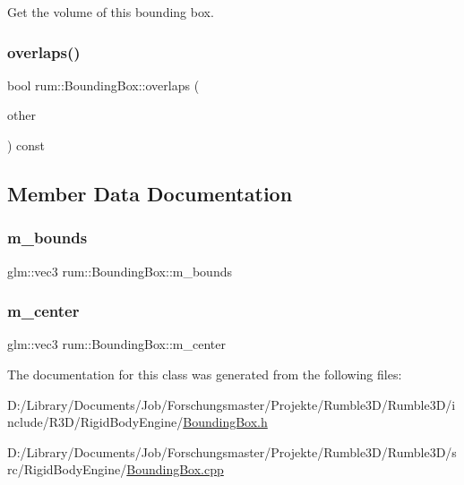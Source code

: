 Get the volume of this bounding box. \mbox{\label{classrum_1_1_bounding_box_a798ccec9c372ac1591c9b8b386998784}} 
\subsubsection{\texorpdfstring{overlaps()}{overlaps()}}
{\footnotesize\ttfamily bool rum\+::\+Bounding\+Box\+::overlaps (\begin{DoxyParamCaption}\item[{const \mbox{\hyperlink{classrum_1_1_bounding_box}{Bounding\+Box}} $\ast$}]{other }\end{DoxyParamCaption}) const}



\subsection{Member Data Documentation}
\mbox{\label{classrum_1_1_bounding_box_a676df9315a0bf21962b02c65cb765a3a}} 
\subsubsection{\texorpdfstring{m\+\_\+bounds}{m\_bounds}}
{\footnotesize\ttfamily glm\+::vec3 rum\+::\+Bounding\+Box\+::m\+\_\+bounds\hspace{0.3cm}{\ttfamily [protected]}}

\mbox{\label{classrum_1_1_bounding_box_af9c7a5df5b02f646a1aa0d5cf0c4e1fd}} 
\subsubsection{\texorpdfstring{m\+\_\+center}{m\_center}}
{\footnotesize\ttfamily glm\+::vec3 rum\+::\+Bounding\+Box\+::m\+\_\+center\hspace{0.3cm}{\ttfamily [protected]}}



The documentation for this class was generated from the following files\+:\begin{DoxyCompactItemize}
\item 
D\+:/\+Library/\+Documents/\+Job/\+Forschungsmaster/\+Projekte/\+Rumble3\+D/\+Rumble3\+D/include/\+R3\+D/\+Rigid\+Body\+Engine/\mbox{\hyperlink{_bounding_box_8h}{Bounding\+Box.\+h}}\item 
D\+:/\+Library/\+Documents/\+Job/\+Forschungsmaster/\+Projekte/\+Rumble3\+D/\+Rumble3\+D/src/\+Rigid\+Body\+Engine/\mbox{\hyperlink{_bounding_box_8cpp}{Bounding\+Box.\+cpp}}\end{DoxyCompactItemize}
